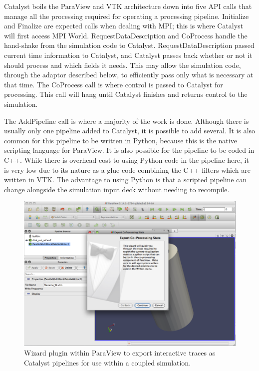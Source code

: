 Catalyst boils the ParaView and VTK architecture down into five API calls that
manage all the processing required for operating a processing pipeline.
Initialize and Finalize are expected calls when dealing with MPI; this is where
Catalyst will first access MPI World.  RequestDataDescription and CoProcess
handle the hand-shake from the simulation code to Catalyst.
RequestDataDescription passed current time information to Catalyst, and
Catalyst passes back whether or not it should process and which fields it
needs.  This may allow the simulation code, through the adaptor described
below, to efficiently pass only what is necessary at that time.  The CoProcess
call is where control is passed to Catalyst for processing.  This call will
hang until Catalyst finishes and returns control to the simulation.

The AddPipeline call is where a majority of the work is done.  Although there
is usually only one pipeline added to Catalyst, it is possible to add several.
It is also common for this pipeline to be written in Python, because this is
the native scripting language for ParaView.  It is also possible for the
pipeline to be coded in C++.  While there is overhead cost to using
Python code in the pipeline here, it is very low due to its nature as a glue
code combining the C++ filters which are written in VTK.  The advantage to
using Python is that a scripted pipeline can change alongside the simulation
input deck without needing to recompile.

\begin{figure}[htb]
  \centering
  \includegraphics{figures/ScriptExport}
  \caption{Wizard plugin within ParaView to export interactive traces as 
Catalyst pipelines for use within a coupled simulation.}
  \label{fig:ScriptExport}
\end{figure}

